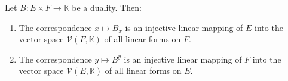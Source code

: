Let $B: E \times F \to \mathbb{K}$ be a duality. Then:
\begin{enumerate}
\item[(i)] The correspondence $x \mapsto B_x$ is an injective linear mapping of $E$ into the vector space $\mathcal{V}(F, \mathbb{K})$ of all linear forms on $F$.
\item[(ii)] The correspondence $y \mapsto B^y$ is an injective linear mapping of $F$ into the vector space $\mathcal{V}(E, \mathbb{K})$ of all linear forms on $E$.
\end{enumerate}
